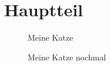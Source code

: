 \chapter{Hauptteil}

\blindtext[1]

\blindtext[2]

\blindtext[2]

\blindtext[2]

\begin{figure}
\centering
{}
\caption{Meine Katze}\label{fig:katze1}
\end{figure}

\begin{figure}
\centering
{}
\caption{Meine Katze nochmal}\label{fig:katze2}
\end{figure}


\blindtext[2]

